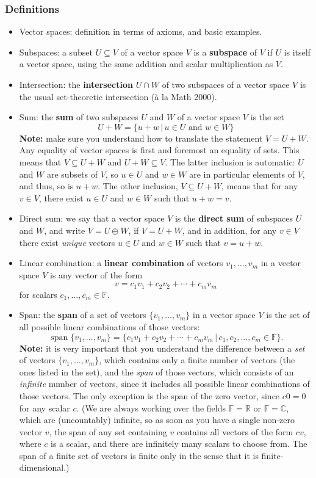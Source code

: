 \documentclass[12pt,letterpaper]{article}
\newcommand{\F}{\mathbb{F}}
\DeclareMathOperator{\spn}{span}
\begin{document}
\subsubsection*{Definitions}
\begin{itemize}
\item Vector spaces: definition in terms of axioms, and basic examples.
\item Subspaces: a subset $U\subseteq V$ of a vector space $V$ is a {\bf subspace} of $V$ if $U$ is itself a vector space, using the same addition and scalar multiplication as $V$.
\item Intersection: the {\bf intersection} $U\cap W$ of two subspaces of a vector space $V$ is the usual set-theoretic intersection (\`a la Math 2000).
\item Sum: the {\bf sum} of two subspaces $U$ and $W$ of a vector space $V$ is the set
\[
U+W = \{u+w\,|\,u\in U \text{ and } w\in W\}
\]
{\bf Note:} make sure you understand how to translate the statement $V=U+W$. Any equality of vector spaces is first and foremost an equality of sets. This means that $V\subseteq U+W$ and $U+W\subseteq V$. The latter inclusion is automatic: $U$ and $W$ are subsets of $V$, so $u\in U$ and $w\in W$ are in particular elements of $V$, and thus, so is $u+w$. The other inclusion, $V\subseteq U+W$, means that for any $v\in V$, there exist $u\in U$ and $w\in W$ such that $u+w=v$.
\item Direct sum: we say that a vector space $V$ is the {\bf direct sum} of subspaces $U$ and $W$, and write $V=U\oplus W$, if $V=U+W$, and in addition, for any $v\in V$ there exist {\em unique} vectors $u\in U$ and $w\in W$ such that $v=u+w$.
\item Linear combination: a {\bf linear combination} of vectors $v_1,\ldots, v_m$ in a vector space $V$ is any vector of the form
\[
v=c_1v_1+c_2v_2+\cdots+c_mv_m
\]
for scalars $c_1,\ldots, c_m\in\mathbb{F}$.
\item Span: the {\bf span} of a set of vectors $\{v_1,\ldots, v_m\}$ in a vector space $V$ is the set of all possible linear combinations of those vectors:
\[
\spn\{v_1,\ldots, v_m\} = \{c_1v_1+c_2v_2+\cdots +c_mv_m\,|\, c_1,c_2,\ldots, c_m\in\F\}.
\]
{\bf Note:} it is very important that you understand the difference between a {\em set} of vectors $\{v_1,\ldots, v_m\}$, which contains only a finite number of vectors (the ones listed in the set), and the {\em span} of those vectors, which consists of an {\em infinite} number of vectors, since it includes all possible linear combinations of those vectors. The only exception is the span of the zero vector, since $c0=0$ for any scalar $c$. (We are always working over the fields $\F=\mathbb{R}$ or $\F=\mathbb{C}$, which are (uncountably) infinite, so as soon as you have a single non-zero vector $v$, the span of any set containing $v$ contains all vectors of the form $cv$, where $c$ is a scalar, and there are infinitely many scalars to choose from. The span of a finite set of vectors is finite only in the sense that it is finite-dimensional.)


\end{itemize}
\end{document}
